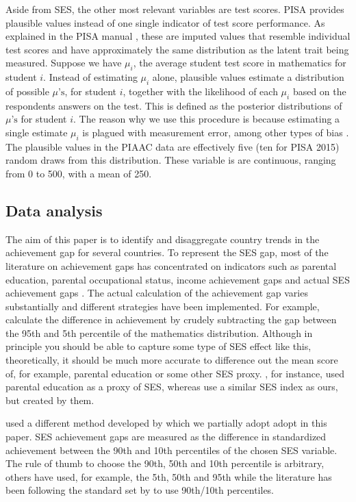 \documentclass[11pt, a4paper]{article}\usepackage[]{graphicx}\usepackage[]{color}
\begin{document}
Aside from SES, the other most relevant variables are test scores. PISA provides plausible values instead of one single indicator of test score performance. As explained in the PISA manual \citep{pisa2012_technical}, these are imputed values that resemble individual test scores and have approximately the same distribution as the latent trait being measured. Suppose we have \(\mu_i\), the average student test score in mathematics for student \(i\). Instead of estimating \(\mu_i\) alone, plausible values estimate a distribution of possible \(\mu\text{'s}\), for student \(i\), together with the likelihood of each \(\mu_i\) based on the respondents answers on the test. This is defined as the posterior distributions of \(\mu\text{'s}\) for student \(i\). The reason why we use this procedure is because estimating a single estimate \(\mu_i\) is plagued with measurement error, among other types of bias \citep[see][]{wu2005}. The plausible values in the PIAAC data are effectively five (ten for PISA 2015) random draws from this distribution. These variable is are continuous, ranging from 0 to 500, with a mean of 250.

\subsection{Data analysis}

The aim of this paper is to identify and disaggregate country trends in the achievement gap for several countries. To represent the SES gap, most of the literature on achievement gaps has concentrated on indicators such as parental education, parental occupational status, income achievement gaps and actual SES achievement gaps \citep{fryer2004}. The actual calculation of the achievement gap varies substantially and different strategies have been implemented. For example, \citet{micklewright} calculate the difference in achievement by crudely subtracting the gap between the 95th and 5th percentile of the mathematics distribution. Although in principle you should be able to capture some type of SES effect like this, theoretically, it should be much more accurate to difference out the mean score of, for example, parental education or some other SES proxy. \citet{saw2016}, for instance, used parental education as a proxy of SES, whereas \citet{byun2010} use a similar SES index as ours, but created by them.

\citet{reardon_portilla, anna2016, anna2016_global} used a different method developed by \citet{reardon2011} which we partially adopt adopt in this paper. SES achievement gaps are measured as the difference in standardized achievement between the 90th and 10th percentiles of the chosen SES variable. The rule of thumb to choose the 90th, 50th and 10th percentile is arbitrary, others have used, for example, the 5th, 50th and 95th \citep{micklewright} while the literature has been following the standard set by \citet{reardon2011} to use 90th/10th percentiles.
\end{document}
